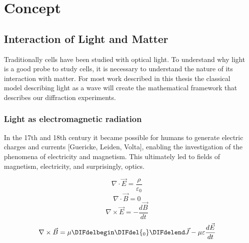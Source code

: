 \part{Concept}%

\chapter{Interaction of Light and Matter}
Traditionally cells have been studied with optical light. To
understand why light is a good probe to study cells, it is necessary
to understand the nature of its interaction with matter. For most work
described in this thesis the classical model \DIFaddbegin {}\DIFaddend describing light as a
wave \DIFdelbegin {}\DIFdelend \DIFaddbegin {}\DIFaddend will create the mathematical
framework that describes \DIFaddbegin {}\DIFaddend our diffraction
experiments.

\section{Light as electromagnetic radiation}
In the 17th and 18th century it became possible for humans to generate
\DIFdelbegin {}\DIFdelend electric charges and \DIFaddbegin {}\DIFaddend currents [Guericke, Leiden, Volta],
enabling the investigation of the phenomena of electricity and
magnetism. This ultimately led to \DIFdelbegin {}\DIFdelend \DIFaddbegin {}\DIFaddend fields of magnetism, electricity, and
\DIFaddbegin {}\DIFaddend surprisingly, optics. \DIFaddbegin {}\DIFaddend 

\begin{equation} \nabla \cdot   \vec{E} = \frac{\rho}{\varepsilon_0 }\label{eq:maxlaw1}\end{equation}
\begin{equation} \nabla \cdot   \vec{B} = 0 \label{eq:maxlaw2}\end{equation}
\begin{equation} \nabla \times \vec{E} = -\frac{d\vec{B}}{dt}\label{eq:maxlaw3}\end{equation}
\begin{equation} \nabla \times \vec{B} = \mu \DIFdelbegin \DIFdel{_0 }\DIFdelend \vec{J} -\mu\varepsilon\frac{d\vec{E}}{dt}\label{eq:maxlaw4}\end{equation}


